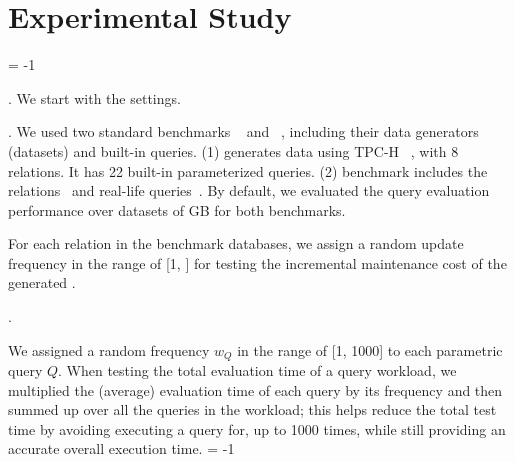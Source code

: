\vspace{-0.3ex}
\section{Experimental Study}
\label{sec-expt}
\vspace{-0.4ex}

\looseness = -1


. We start with the settings.

. We used two standard benchmarks
\tpch~\cite{tpch} and \imdb~\cite{LeisGMBK015}, including their
data generators (datasets) and built-in queries.
(1) \tpch generates data using {\small TPC-H}
~\cite{tpch}, with 8 relations. It has 22 built-in
parameterized \SQL queries.
(2) \imdb benchmark includes the \imdb relations~\cite{imdbdata}
and \xx real-life \SQL queries~\cite{imdbquery}.
By default, we evaluated the query evaluation performance over
datasets of \xx GB for both benchmarks.

For each relation in the benchmark databases, we assign a random
update frequency in the range of [1, ] for testing the
incremental maintenance cost of the generated \bdss. 












.

\vspace{0.6ex}
We assigned a random frequency $w_{Q}$ in the range
of [1, 1000] to each
parametric query $Q$. When testing the total
evaluation time of a query workload, we multiplied the (average)
evaluation time of each query by its frequency and then summed up
over all the queries in the workload; this helps reduce the total
test time by avoiding executing a query for, \eg up to 1000
times, while still providing an accurate overall execution time.
\looseness = -1


